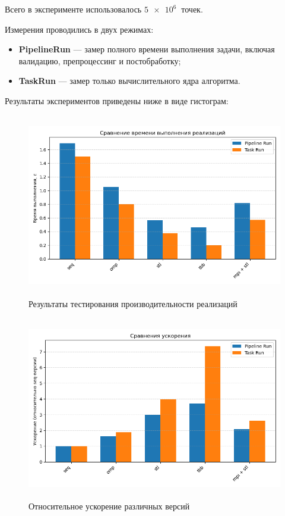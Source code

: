 \documentclass[12pt,a4paper]{article}
\begin{document}
Всего в эксперименте использовалось \(\SI{5e6}{}\) точек.

Измерения проводились в двух режимах:

\begin{itemize}
    \item \textbf{PipelineRun} — замер полного времени выполнения задачи, включая валидацию, препроцессинг и постобработку;
    \item \textbf{TaskRun} — замер только вычислительного ядра алгоритма.
\end{itemize}

Результаты экспериментов приведены ниже в виде гистограм:

\begin{figure}[H]
\centering
\includegraphics[height=8cm]{img/perf_stat_info_1.png}
\caption{\label{fig:visualClass} Результаты тестирования производительности реализаций}
\end{figure}

\begin{figure}[H]
\centering
\includegraphics[height=8cm]{img/perf_stat_info_2.png}
\caption{\label{fig:visualClass} Относительное ускорение различных версий}
\end{figure}
\end{document}
